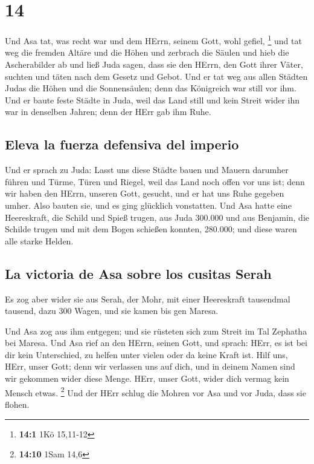 \hypertarget{section-13}{%
\section{14}\label{section-13}}

 Und Asa tat, was recht war und dem HErrn, seinem Gott,
wohl gefiel, \footnote{\textbf{14:1} 1Kö 15,11-12}  und
tat weg die fremden Altäre und die Höhen und zerbrach die Säulen und
hieb die Ascherabilder ab  und ließ Juda sagen, dass sie
den HErrn, den Gott ihrer Väter, suchten und täten nach dem Gesetz und
Gebot.  Und er tat weg aus allen Städten Judas die Höhen
und die Sonnensäulen; denn das Königreich war still vor ihm.
 Und er baute feste Städte in Juda, weil das Land still
und kein Streit wider ihn war in denselben Jahren; denn der HErr gab ihm
Ruhe.

\hypertarget{eleva-la-fuerza-defensiva-del-imperio}{%
\subsection{Eleva la fuerza defensiva del
imperio}\label{eleva-la-fuerza-defensiva-del-imperio}}

 Und er sprach zu Juda: Lasst uns diese Städte bauen und
Mauern darumher führen und Türme, Türen und Riegel, weil das Land noch
offen vor uns ist; denn wir haben den HErrn, unseren Gott, gesucht, und
er hat uns Ruhe gegeben umher. Also bauten sie, und es ging glücklich
vonstatten.  Und Asa hatte eine Heereskraft, die Schild
und Spieß trugen, aus Juda 300.000 und aus Benjamin, die Schilde trugen
und mit dem Bogen schießen konnten, 280.000; und diese waren alle starke
Helden.

\hypertarget{la-victoria-de-asa-sobre-los-cusitas-serah}{%
\subsection{La victoria de Asa sobre los cusitas
Serah}\label{la-victoria-de-asa-sobre-los-cusitas-serah}}

 Es zog aber wider sie aus Serah, der Mohr, mit einer
Heereskraft tausendmal tausend, dazu 300 Wagen, und sie kamen bis gen
Maresa.

 Und Asa zog aus ihm entgegen; und sie rüsteten sich zum
Streit im Tal Zephatha bei Maresa.  Und Asa rief an den
HErrn, seinen Gott, und sprach: HErr, es ist bei dir kein Unterschied,
zu helfen unter vielen oder da keine Kraft ist. Hilf uns, HErr, unser
Gott; denn wir verlassen uns auf dich, und in deinem Namen sind wir
gekommen wider diese Menge. HErr, unser Gott, wider dich vermag kein
Mensch etwas. \footnote{\textbf{14:10} 1Sam 14,6}  Und
der HErr schlug die Mohren vor Asa und vor Juda, dass sie flohen.

